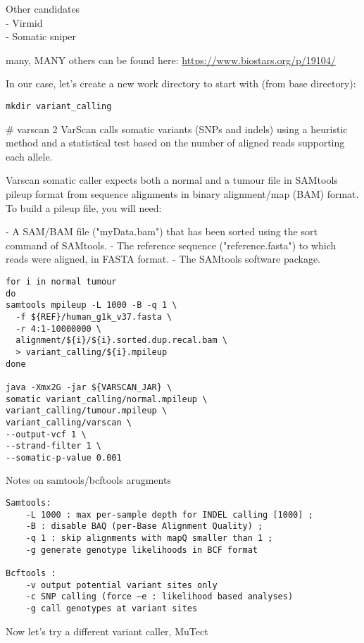 Other candidates \\
- Virmid \\
- Somatic sniper

many, MANY others can be found here:
\url{https://www.biostars.org/p/19104/}


In our case, let's create a new work directory to start with (from base directory):

\begin{lstlisting}
mkdir variant_calling
\end{lstlisting}

\# varscan 2
VarScan calls somatic variants (SNPs and indels) using a heuristic method and a statistical test based on the number of aligned reads supporting each allele.

Varscan somatic caller expects both a normal and a tumour file in SAMtools pileup format from sequence alignments in binary alignment/map (BAM) format. To build a pileup file, you will need:

- A SAM/BAM file ("myData.bam") that has been sorted using the sort command of SAMtools.
- The reference sequence ("reference.fasta") to which reads were aligned, in FASTA format.
- The SAMtools software package.


\begin{lstlisting}
for i in normal tumour
do
samtools mpileup -L 1000 -B -q 1 \
  -f ${REF}/human_g1k_v37.fasta \
  -r 4:1-10000000 \
  alignment/${i}/${i}.sorted.dup.recal.bam \
  > variant_calling/${i}.mpileup
done

java -Xmx2G -jar ${VARSCAN_JAR} \
somatic variant_calling/normal.mpileup \
variant_calling/tumour.mpileup \
variant_calling/varscan \
--output-vcf 1 \
--strand-filter 1 \
--somatic-p-value 0.001 
\end{lstlisting}

Notes on samtools/bcftools arugments
\begin{verbatim}
Samtools:
	-L 1000 : max per-sample depth for INDEL calling [1000] ; 
	-B : disable BAQ (per-Base Alignment Quality) ; 
	-q 1 : skip alignments with mapQ smaller than 1 ; 
	-g generate genotype likelihoods in BCF format

Bcftools :
	-v output potential variant sites only
	-c SNP calling (force –e : likelihood based analyses)
	-g call genotypes at variant sites
\end{verbatim}

Now let's try a different variant caller, MuTect \\

